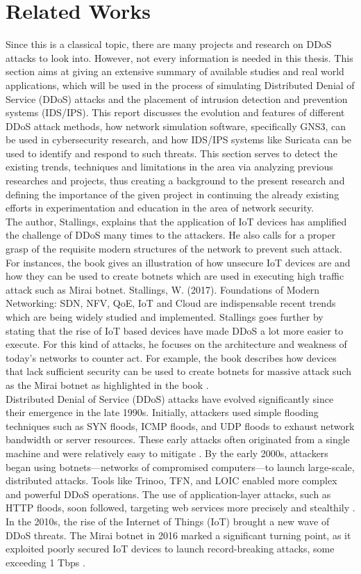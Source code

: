 \section{Related Works}
Since this is a classical topic, there are many projects and research on DDoS attacks to look into. However, not every information is needed in this thesis. This section aims at giving an extensive summary of available studies and real world applications, which will be used in the process of simulating Distributed Denial of Service (DDoS) attacks and the placement of intrusion detection and prevention systems (IDS/IPS). This report discusses the evolution and features of different DDoS attack methods, how network simulation software, specifically GNS3, can be used in cybersecurity research, and how IDS/IPS systems like Suricata  can be used to identify and respond to such threats. This section serves to detect the existing trends, techniques and limitations in the area via analyzing previous researches and projects, thus creating a background to the present research and defining the importance of the given project in continuing the already existing efforts in experimentation and education in the area of network security. 
\\ 
The author, Stallings, explains that the application of IoT devices has amplified the challenge of DDoS many times to the attackers. He also calls for a proper grasp of the requisite modern structures of the network to prevent such attack. For instances, the book gives an illustration of how unsecure IoT devices are and how they can be used to create botnets which are used in executing high traffic attack such as Mirai botnet. Stallings, W. (2017). Foundations of Modern Networking: SDN, NFV, QoE, IoT and Cloud are indispensable recent trends which are being widely studied and implemented.
Stallings goes further by stating that the rise of IoT based devices have made DDoS a lot more easier to execute. For this kind of attacks, he focuses on the architecture and weakness of today’s networks to counter act. For example, the book describes how devices that lack sufficient security can be used to create botnets for massive attack such as the Mirai botnet as highlighted in the book \cite{stallings2015foundations}.
\\
Distributed Denial of Service (DDoS) attacks have evolved significantly since their emergence in the late 1990s. Initially, attackers used simple flooding techniques such as SYN floods, ICMP floods, and UDP floods to exhaust network bandwidth or server resources. These early attacks often originated from a single machine and were relatively easy to mitigate \cite{da2018detection}. By the early 2000s, attackers began using botnets—networks of compromised computers—to launch large-scale, distributed attacks. Tools like Trinoo, TFN, and LOIC enabled more complex and powerful DDoS operations. The use of application-layer attacks, such as HTTP floods, soon followed, targeting web services more precisely and stealthily \cite{ozccelik2020distributed}. In the 2010s, the rise of the Internet of Things (IoT) brought a new wave of DDoS threats. The Mirai botnet in 2016 marked a significant turning point, as it exploited poorly secured IoT devices to launch record-breaking attacks, some exceeding 1 Tbps \cite{https://web.archive.org}.
